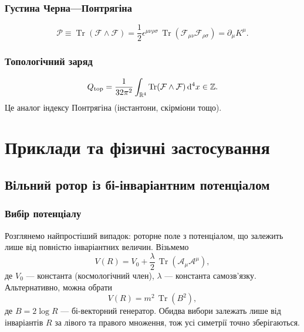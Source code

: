 \documentclass[11pt,a4paper]{article}
\numberwithin{equation}{section}
\theoremstyle{plain}
\theoremstyle{definition}
\theoremstyle{remark}
\DeclareMathOperator{\Tr}{Tr}
\newcommand{\dd}{\mathrm{d}}
\begin{document}
\subsubsection{Густина Черна—Понтрягіна}

\begin{equation}
\mathcal{P} \equiv \Tr(\mathcal{F}\wedge\mathcal{F}) = \frac{1}{2}\epsilon^{\mu\nu\rho\sigma}\,\Tr(\mathcal{F}_{\mu\nu}\mathcal{F}_{\rho\sigma})=\partial_\mu K^\mu.
\label{eq:chern-pontryagin}
\end{equation}

\subsubsection{Топологічний заряд}

\begin{equation}
Q_{\rm top} = \frac{1}{32\pi^2}\int_{\mathbb{R}^4} \Tr(\mathcal{F}\wedge\mathcal{F})\, \dd^4x \in \mathbb{Z}.
\label{eq:Q-top}
\end{equation}
Це аналог індексу Понтрягіна (інстантони, скірміони тощо).

\section{Приклади та фізичні застосування}
\label{sec:examples}

\subsection{Вільний ротор із бі-інваріантним потенціалом}

\subsubsection{Вибір потенціалу}

Розглянемо найпростіший випадок: роторне поле з потенціалом, що залежить лише від повністю інваріантних величин. Візьмемо
\begin{equation}
V(R) = V_0 + \frac{\lambda}{2}\,\Tr(\mathcal{A}_\mu\mathcal{A}^\mu),
\end{equation}
де $V_0$ — константа (космологічний член), $\lambda$ — константа самозв'язку. Альтернативно, можна обрати
\begin{equation}
V(R) = m^2\,\Tr(B^2),
\end{equation}
де $B = 2\log R$ — бі-векторний генератор. Обидва вибори залежать лише від інваріантів $R$ за лівого та правого множення, тож усі симетрії точно зберігаються.
\end{document}
